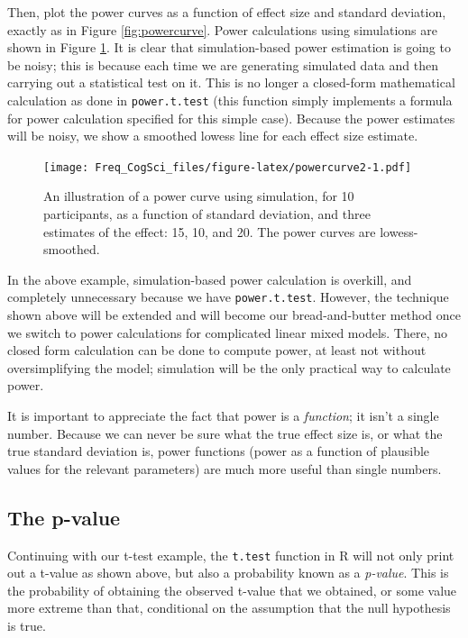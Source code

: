 \documentclass[12pt,]{krantz}
\begin{document}
Then, plot the power curves as a function of effect size and standard deviation, exactly as in Figure \ref{fig:powercurve}. Power calculations using simulations are shown in Figure \ref{fig:powercurve2}. It is clear that simulation-based power estimation is going to be noisy; this is because each time we are generating simulated data and then carrying out a statistical test on it. This is no longer a closed-form mathematical calculation as done in \texttt{power.t.test} (this function simply implements a formula for power calculation specified for this simple case). Because the power estimates will be noisy, we show a smoothed lowess line for each effect size estimate.

\begin{figure}
\centering
\texttt{[image: Freq\_CogSci\_files/figure-latex/powercurve2-1.pdf]}
\caption{\label{fig:powercurve2}An illustration of a power curve using simulation, for 10 participants, as a function of standard deviation, and three estimates of the effect: 15, 10, and 20. The power curves are lowess-smoothed.}
\end{figure}

In the above example, simulation-based power calculation is overkill, and completely unnecessary because we have \texttt{power.t.test}. However, the technique shown above will be extended and will become our bread-and-butter method once we switch to power calculations for complicated linear mixed models. There, no closed form calculation can be done to compute power, at least not without oversimplifying the model; simulation will be the only practical way to calculate power.

It is important to appreciate the fact that power is a \emph{function}; it isn't a single number. Because we can never be sure what the true effect size is, or what the true standard deviation is, power functions (power as a function of plausible values for the relevant parameters) are much more useful than single numbers.

\hypertarget{the-p-value}{%
\subsection{The p-value}\label{the-p-value}}

Continuing with our t-test example, the \texttt{t.test} function in R will not only print out a t-value as shown above, but also a probability known as a \emph{p-value}. This is the probability of obtaining the observed t-value that we obtained, or some value more extreme than that, conditional on the assumption that the null hypothesis is true.
\end{document}
